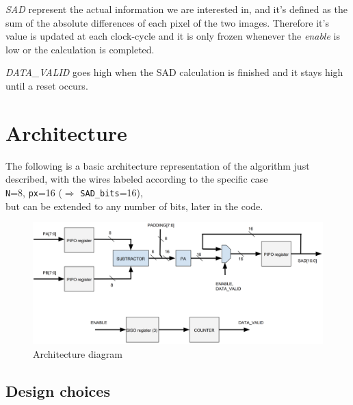 \documentclass[12pt, a4paper]{article}
\begin{document}
\textit{SAD} represent the actual information we are interested in, and it's defined as the sum of the absolute differences of each pixel of the two images. 
Therefore it's value is updated at each clock-cycle and it is only frozen whenever the \textit{enable} is low or the calculation is completed.

\textit{DATA\_VALID} goes high when the SAD calculation is finished and it stays high until a reset occurs.






\section{Architecture}

The following is a basic architecture representation of the algorithm just described, with the wires labeled according to the specific case\\ 
\texttt{N}=8, \texttt{px}=16 ($\Rightarrow$ \texttt{SAD\_bits}=16),\\ 
but can be extended to any number of bits, later in the code.
\newline



\begin{figure}[h]
\centering
\includegraphics[scale=0.3]{../screenshots/arch1.png}
\caption{Architecture diagram}\label{fig:7}
\end{figure}


\subsection{Design choices}

\end{document}
